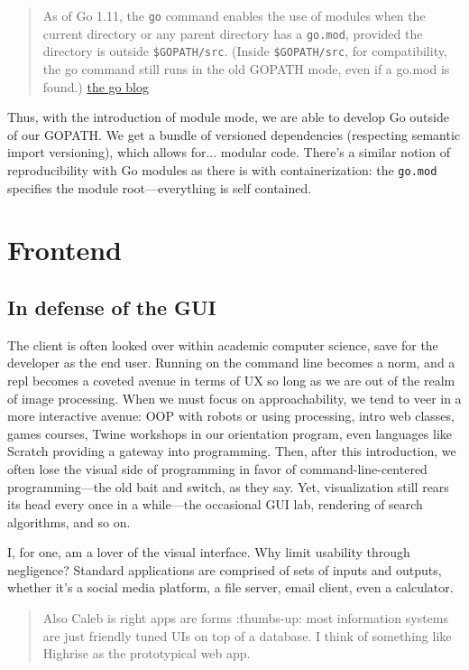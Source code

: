 \documentclass[11pt, twoside, reqno]{book}
\begin{document}
\begin{quote}
As of Go 1.11, the \texttt{go} command enables the use of modules when the current directory or any parent directory has a \texttt{go.mod}, provided the directory is outside \texttt{\$GOPATH/src}. (Inside \texttt{\$GOPATH/src}, for compatibility, the go command still runs in the old GOPATH mode, even if a go.mod is found.) \href{https://blog.golang.org/using-go-modules}{the go blog}
\end{quote}

Thus, with the introduction of module mode, we are able to develop Go outside of our GOPATH. We get a bundle of versioned dependencies (respecting semantic import versioning), which allows for... modular code. There's a similar notion of reproducibility with Go modules as there is with containerization: the \texttt{go.mod} specifies the module root—everything is self contained.

\chapter{Frontend}

\section{In defense of the GUI}

The client is often looked over within academic computer science, save for the developer as the end user. Running on the command line becomes a norm, and a repl becomes a coveted avenue in terms of UX so long as we are out of the realm of image processing. When we must focus on approachability, we tend to veer in a more interactive avenue: OOP with robots or using processing, intro web classes, games courses, Twine workshops in our orientation program, even languages like Scratch providing a gateway into programming. Then, after this introduction, we often lose the visual side of programming in favor of command-line-centered programming—the old bait and switch, as they say. Yet, visualization still rears its head every once in a while—the occasional GUI lab, rendering of search algorithms, and so on.

I, for one, am a lover of the visual interface. Why limit usability through negligence? Standard applications are comprised of sets of inputs and outputs, whether it's a social media platform, a file server, email client, even a calculator.

\begin{quote}
Also Caleb is right apps are forms :thumbs-up: most information systems are just friendly tuned UIs on top of a database. I think of something like Highrise as the prototypical web app.
\end{quote}
\end{document}
